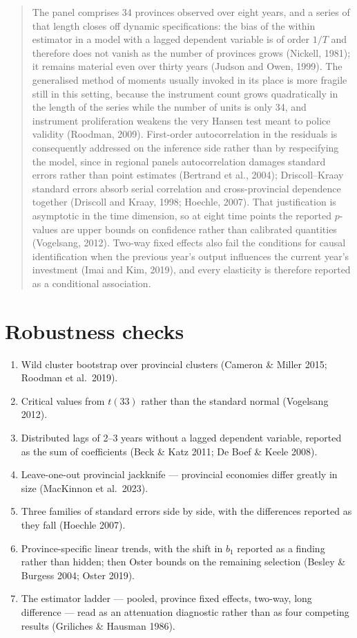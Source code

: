 \documentclass[11pt,a4paper]{article}
\begin{document}
\begin{quote}\small
The panel comprises 34 provinces observed over eight years, and a series of that length closes
off dynamic specifications: the bias of the within estimator in a model with a lagged dependent
variable is of order $1/T$ and therefore does not vanish as the number of provinces grows
(Nickell, 1981); it remains material even over thirty years (Judson and Owen, 1999). The
generalised method of moments usually invoked in its place is more fragile still in this
setting, because the instrument count grows quadratically in the length of the series while the
number of units is only 34, and instrument proliferation weakens the very Hansen test meant to
police validity (Roodman, 2009). First-order autocorrelation in the residuals is consequently
addressed on the inference side rather than by respecifying the model, since in regional panels
autocorrelation damages standard errors rather than point estimates (Bertrand et al., 2004);
Driscoll--Kraay standard errors absorb serial correlation and cross-provincial dependence
together (Driscoll and Kraay, 1998; Hoechle, 2007). That justification is asymptotic in the time
dimension, so at eight time points the reported $p$-values are upper bounds on confidence rather
than calibrated quantities (Vogelsang, 2012). Two-way fixed effects also fail the conditions for
causal identification when the previous year's output influences the current year's investment
(Imai and Kim, 2019), and every elasticity is therefore reported as a conditional association.
\end{quote}

\section{Robustness checks}

\begin{enumerate}[leftmargin=1.4em,itemsep=0.25em]
\item Wild cluster bootstrap over provincial clusters (Cameron \& Miller 2015; Roodman et al.\ 2019).
\item Critical values from $t(33)$ rather than the standard normal (Vogelsang 2012).
\item Distributed lags of 2--3 years without a lagged dependent variable, reported as the sum of
coefficients (Beck \& Katz 2011; De Boef \& Keele 2008).
\item Leave-one-out provincial jackknife --- provincial economies differ greatly in size
(MacKinnon et al.\ 2023).
\item Three families of standard errors side by side, with the differences reported as they fall
(Hoechle 2007).
\item Province-specific linear trends, with the shift in $b_1$ reported as a finding rather than
hidden; then Oster bounds on the remaining selection (Besley \& Burgess 2004; Oster 2019).
\item The estimator ladder --- pooled, province fixed effects, two-way, long difference --- read
as an attenuation diagnostic rather than as four competing results (Griliches \& Hausman 1986).
\end{enumerate}
\end{document}
